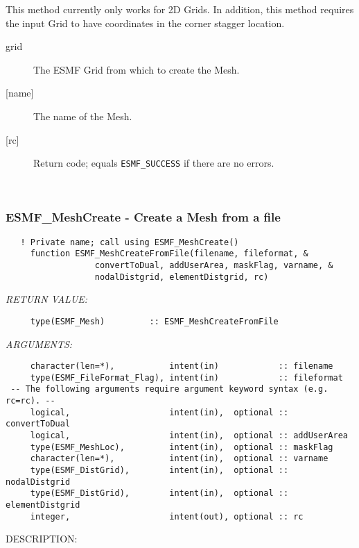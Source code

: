      This method currently only works for 2D Grids. In addition, this method requires
     the input Grid to have coordinates in the corner stagger location.
  
     \begin{description}
     \item [grid]
           The ESMF Grid from which to create the Mesh.
     \item [{[name]}]
           The name of the Mesh.
     \item [{[rc]}]
           Return code; equals {\tt ESMF\_SUCCESS} if there are no errors.
     \end{description}
   
 
\mbox{}\hrulefill\ 
 

  \label{API:MeshCreateFromFile}\subsubsection [ESMF\_MeshCreate] {ESMF\_MeshCreate - Create a Mesh from a file}


  
\begin{verbatim}   ! Private name; call using ESMF_MeshCreate()
     function ESMF_MeshCreateFromFile(filename, fileformat, &
                  convertToDual, addUserArea, maskFlag, varname, &
                  nodalDistgrid, elementDistgrid, rc)\end{verbatim}{\em RETURN VALUE:}
\begin{verbatim}     type(ESMF_Mesh)         :: ESMF_MeshCreateFromFile\end{verbatim}{\em ARGUMENTS:}
\begin{verbatim}     character(len=*),           intent(in)            :: filename
     type(ESMF_FileFormat_Flag), intent(in)            :: fileformat
 -- The following arguments require argument keyword syntax (e.g. rc=rc). --
     logical,                    intent(in),  optional :: convertToDual
     logical,                    intent(in),  optional :: addUserArea
     type(ESMF_MeshLoc),         intent(in),  optional :: maskFlag
     character(len=*),           intent(in),  optional :: varname
     type(ESMF_DistGrid),        intent(in),  optional :: nodalDistgrid
     type(ESMF_DistGrid),        intent(in),  optional :: elementDistgrid
     integer,                    intent(out), optional :: rc\end{verbatim}
{\sf DESCRIPTION:\\ }


